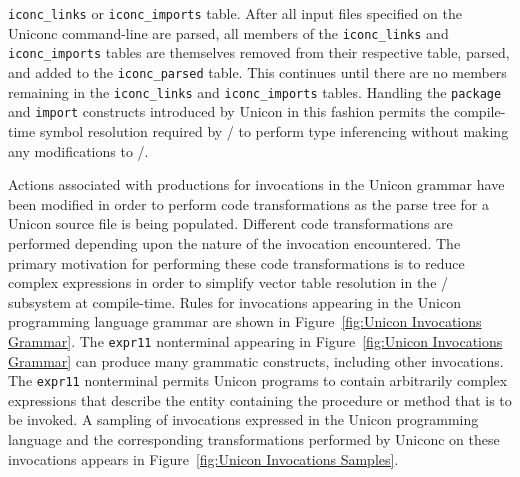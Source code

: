\texttt{iconc\_links} or \texttt{iconc\_imports} table. After all input files
specified on the Uniconc command-line are parsed, all members of the
\texttt{iconc\_links} and \texttt{iconc\_imports} tables are themselves removed
from their respective table, parsed, and added to the \texttt{iconc\_parsed}
table. This continues until there are no members remaining in the
\texttt{iconc\_links} and \texttt{iconc\_imports} tables.
Handling the \texttt{package} and \texttt{import} constructs introduced by
Unicon in this fashion permits the \mbox{compile-time} symbol resolution required by \Ic/
to perform type inferencing without making any modifications to \Ic/.

\label{sect:Invocations}
Actions associated with productions for invocations in the Unicon grammar have
been modified in order to perform code transformations as the parse tree for a
Unicon source file is being populated. Different code transformations are
performed depending upon the nature of the invocation encountered. The primary
motivation for performing these code transformations is to reduce complex
expressions in order to simplify vector table resolution in the \Ic/ subsystem
at \mbox{compile-time}. Rules for invocations appearing in the Unicon programming language
grammar are shown in Figure~\ref{fig:Unicon Invocations Grammar}.  The
\texttt{expr11} nonterminal appearing in
Figure~\ref{fig:Unicon Invocations Grammar} can produce many grammatic
constructs, including other invocations. The \texttt{expr11} nonterminal permits
Unicon programs to contain arbitrarily complex expressions that describe the
entity containing the procedure or method that is to be invoked. A sampling of
invocations expressed in the Unicon programming language and the corresponding
transformations performed by Uniconc on these invocations appears in
Figure~\ref{fig:Unicon Invocations Samples}.

